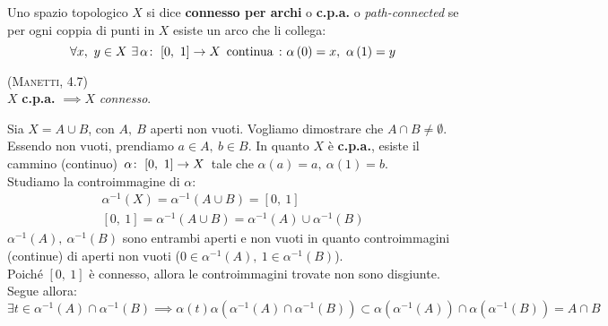 \begin{define}
Uno spazio topologico $X$ si dice \textbf{connesso per archi} o \textbf{c.p.a.} o \textit{path-connected} se per ogni coppia di punti in $X$ esiste un arco che li collega:
\begin{equation}
\forall x,\ y\in X\ \exists \funz{\alpha}{\left[0,\ 1\right]}{X} \text{ continua}\ \colon \alpha\left(0\right)=x,\ \alpha\left(1\right)=y
\end{equation}
\end{define}
\begin{theorema}\textsc{(Manetti, 4.7)}\\
$X$ \textbf{c.p.a.} $\implies X$ \textit{connesso}.
\end{theorema}
\begin{demonstration}
	Sia $X=A\cup B$, con $A,\ B$ aperti non vuoti. Vogliamo dimostrare che $A\cap B\neq \emptyset$. Essendo non vuoti, prendiamo $a\in A,\ b\in B$. In quanto $X$ è \textbf{c.p.a.}, esiste il cammino (continuo) $\funz{\alpha}{\left[0,\ 1\right]}{X}$ tale che $\alpha\left(a\right)=a,\ \alpha\left(1\right)=b$.\\
	Studiamo la controimmagine di $\alpha$:
	\begin{gather*}
		\alpha^{-1}\left(X\right)=\alpha^{-1}\left(A\cup B\right)=\left[0,\ 1\right]\\
		\left[0,\ 1\right]=\alpha^{-1}\left(A\cup B\right)=\alpha^{-1}\left(A\right)\cup \alpha^{-1}\left(B\right)
	\end{gather*}
$\alpha^{-1}\left(A\right),\ \alpha^{-1}\left(B\right)$ sono entrambi aperti e non vuoti in quanto controimmagini (continue) di aperti non vuoti ($0\in \alpha^{-1}\left(A\right),\ 1\in \alpha^{-1}\left(B\right)$).\\
Poiché $\left[0,\ 1\right]$ è connesso, allora le controimmagini trovate non sono disgiunte. Segue allora:
\begin{equation*}
\exists t\in \alpha^{-1}\left(A\right)\cap \alpha^{-1}\left(B\right)\implies \alpha\left(t\right)\alpha\left(\alpha^{-1}\left(A\right)\cap \alpha^{-1}\left(B\right)\right)\subset\alpha\left(\alpha^{-1}\left(A\right)\right)\cap\alpha\left(\alpha^{-1}\left(B\right)\right)=A\cap B
\end{equation*}
\end{demonstration}
